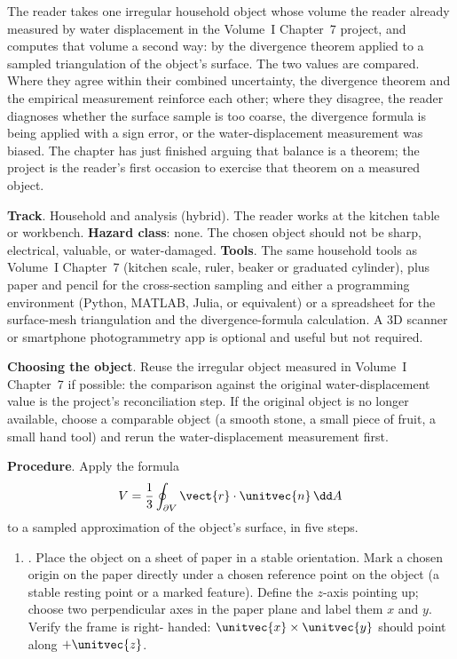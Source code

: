 \begin{project}
The reader takes one irregular household object whose volume the
reader already measured by water displacement in the Volume~I
Chapter~7 project, and computes that volume a second way: by the
divergence theorem applied to a sampled triangulation of the object's
surface. The two values are compared. Where they agree within their
combined uncertainty, the divergence theorem and the empirical
measurement reinforce each other; where they disagree, the reader
diagnoses whether the surface sample is too coarse, the divergence
formula is being applied with a sign error, or the water-displacement
measurement was biased. The chapter has just finished arguing that
balance is a theorem; the project is the reader's first occasion to
exercise that theorem on a measured object.

\textbf{Track}. Household and analysis (hybrid). The reader works at
the kitchen table or workbench. \textbf{Hazard class}: none. The
chosen object should not be sharp, electrical, valuable, or
water-damaged. \textbf{Tools}. The same household tools as
Volume~I Chapter~7 (kitchen scale, ruler, beaker or graduated
cylinder), plus paper and pencil for the cross-section sampling and
either a programming environment (Python, MATLAB, Julia, or
equivalent) or a spreadsheet for the surface-mesh triangulation and
the divergence-formula calculation. A 3D scanner or smartphone
photogrammetry app is optional and useful but not required.

\textbf{Choosing the object}. Reuse the irregular object measured in
Volume~I Chapter~7 if possible: the comparison against the original
water-displacement value is the project's reconciliation step. If
the original object is no longer available, choose a comparable
object (a smooth stone, a small piece of fruit, a small hand tool)
and rerun the water-displacement measurement first.

\textbf{Procedure}. Apply the formula
\[
V = \frac{1}{3} \oint_{\partial V} \vect{r} \cdot \unitvec{n} \,\dd A
\]
to a sampled approximation of the object's surface, in five steps.

\begin{enumerate}[leftmargin=*]
  \item {}. Place the object on
    a sheet of paper in a stable orientation. Mark a chosen origin
    on the paper directly under a chosen reference point on the
    object (a stable resting point or a marked feature). Define the
    $z$-axis pointing up; choose two perpendicular axes in the paper
    plane and label them $x$ and $y$. Verify the frame is right-
    handed: $\unitvec{x} \times \unitvec{y}$ should point along
    $+\unitvec{z}$.


\end{enumerate}
\end{project}
